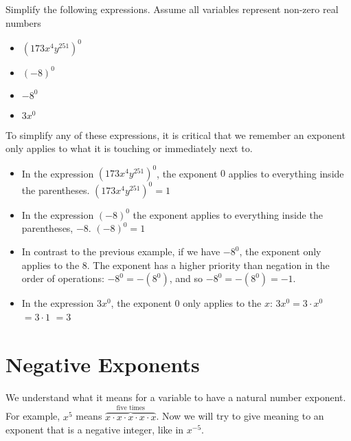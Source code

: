 \documentclass{ximera}
\begin{document}
 \begin{example} Simplify the following expressions.
              Assume all variables represent non-zero real numbers
\begin{itemize}
\item $\left(173 x^4 y^{251}\right)^0$
\item $(-8)^0$
\item $-8^0$
\item  $3x^0$
\end{itemize}
\begin{explanation}
To simplify any of these expressions, it is critical that we remember an exponent only applies to what it is touching or immediately next to.

\begin{itemize}
  \item   In the expression $\left(173 x^4 y^{251}\right)^0$,
                    the exponent $0$ applies to everything inside the parentheses.
$
                      \left(173 x^4 y^{251}\right)^0 =  1
                    $

    \item   In the expression $(-8)^0$ the exponent applies to everything inside the parentheses,
                    $-8$.
                    $
                      (-8)^0  =  1
                    $

     \item   In contrast to the previous example, if we have $-8^0$, 
                    the exponent only applies to the $8$.
                    The exponent has a higher priority than negation in the order of operations: $-8^0 = -\left(8^0\right)$, and so $-8^0  =  -\left(8^0\right)=  -1$.

    \item  In the expression $3x^0$,
                    the exponent $0$ only applies to the $x$:
                      $3x^0 = 3\cdot x^0$
                      $= 3\cdot 1$
                      $= 3$
\end{itemize}
\end{explanation}
\end{example}
\section{Negative Exponents}
   We understand what it means for a variable to have a natural number exponent.
      For example, $x^5$ means $\overbrace{x\cdot x\cdot x\cdot x\cdot x}^{\text{five times}}$.
      Now we will try to give meaning to an exponent that is a negative integer,
      like in $x^{-5}$.
\end{document}
